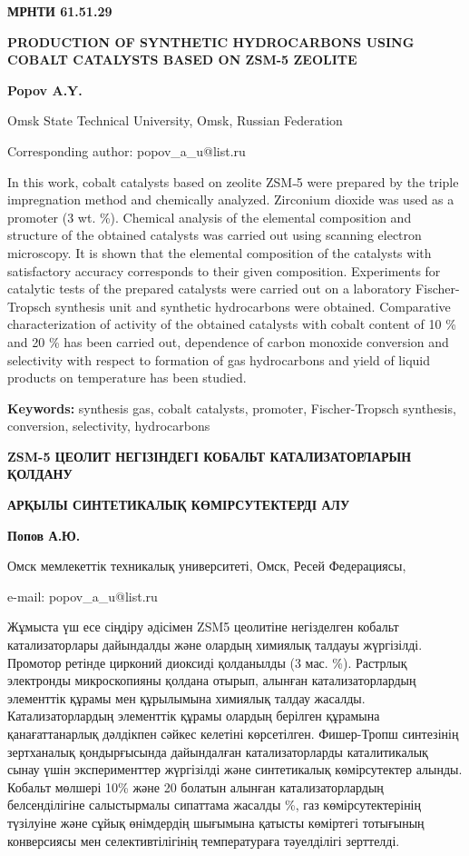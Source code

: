 \newpage
{\bfseries МРНТИ 61.51.29}

{\bfseries PRODUCTION OF SYNTHETIC HYDROCARBONS USING COBALT CATALYSTS
BASED ON ZSM-5 ZEOLITE}

{\bfseries Popov A.Y.}

Omsk State Technical University, Omsk, Russian Federation

Corresponding author: popov\_a\_u@list.ru

In this work, cobalt catalysts based on zeolite ZSM˗5 were prepared by
the triple impregnation method and chemically analyzed. Zirconium
dioxide was used as a promoter (3 wt. \%). Chemical analysis of the
elemental composition and structure of the obtained catalysts was
carried out using scanning electron microscopy. It is shown that the
elemental composition of the catalysts with satisfactory accuracy
corresponds to their given composition. Experiments for catalytic tests
of the prepared catalysts were carried out on a laboratory
Fischer-Tropsch synthesis unit and synthetic hydrocarbons were obtained.
Comparative characterization of activity of the obtained catalysts with
cobalt content of 10 \% and 20 \% has been carried out, dependence of
carbon monoxide conversion and selectivity with respect to formation of
gas hydrocarbons and yield of liquid products on temperature has been
studied.

{\bfseries Keywords:} synthesis gas, cobalt catalysts, promoter,
Fischer-Tropsch synthesis, conversion, selectivity, hydrocarbons

{\bfseries ZSM-5 ЦЕОЛИТ НЕГІЗІНДЕГІ КОБАЛЬТ КАТАЛИЗАТОРЛАРЫН ҚОЛДАНУ}

{\bfseries АРҚЫЛЫ СИНТЕТИКАЛЫҚ КӨМІРСУТЕКТЕРДІ АЛУ}

{\bfseries Попов А.Ю.}

Омск мемлекеттік техникалық университеті, Омск, Ресей Федерациясы,

e-mail: popov\_a\_u@list.ru

Жұмыста үш есе сіңдіру әдісімен ZSM5 цеолитіне негізделген кобальт
катализаторлары дайындалды және олардың химиялық талдауы жүргізілді.
Промотор ретінде цирконий диоксиді қолданылды (3 мас. \%). Растрлық
электронды микроскопияны қолдана отырып, алынған катализаторлардың
элементтік құрамы мен құрылымына химиялық талдау жасалды.
Катализаторлардың элементтік құрамы олардың берілген құрамына
қанағаттанарлық дәлдікпен сәйкес келетіні көрсетілген. Фишер-Тропш
синтезінің зертханалық қондырғысында дайындалған катализаторларды
каталитикалық сынау үшін эксперименттер жүргізілді және синтетикалық
көмірсутектер алынды. Кобальт мөлшері 10\% және 20 болатын алынған
катализаторлардың белсенділігіне салыстырмалы сипаттама жасалды \%, газ
көмірсутектерінің түзілуіне және сұйық өнімдердің шығымына қатысты
көміртегі тотығының конверсиясы мен селективтілігінің температураға
тәуелділігі зерттелді.

